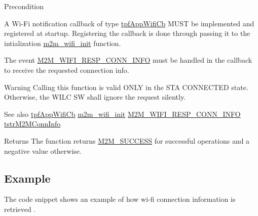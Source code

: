 \begin{DoxyPrecond}{Precondition}

\begin{DoxyItemize}
\item A Wi-\/\+Fi notification callback of type \hyperlink{group__WlanEnums_gac5302f32839285fe8375c159087aa8a1}{tpf\+App\+Wifi\+Cb} M\+U\+ST be implemented and registered at startup. Registering the callback is done through passing it to the intialization \hyperlink{group__WifiInitFn_ga73c734812e844d96d860c4e93e9daf35}{m2m\+\_\+wifi\+\_\+init} function.
\item The event \hyperlink{group__WlanEnums_gga064de09dec1d5e88ed8d075fa40f57dea35767ad0217ab92b149bc77e79610d33}{M2\+M\+\_\+\+W\+I\+F\+I\+\_\+\+R\+E\+S\+P\+\_\+\+C\+O\+N\+N\+\_\+\+I\+N\+FO} must be handled in the callback to receive the requested connection info.
\end{DoxyItemize}
\end{DoxyPrecond}
\begin{DoxyWarning}{Warning}
Calling this function is valid O\+N\+LY in the S\+TA C\+O\+N\+N\+E\+C\+T\+ED state. Otherwise, the W\+I\+LC SW shall ignore the request silently.
\end{DoxyWarning}
\begin{DoxySeeAlso}{See also}
\hyperlink{group__WlanEnums_gac5302f32839285fe8375c159087aa8a1}{tpf\+App\+Wifi\+Cb} \hyperlink{group__WifiInitFn_ga73c734812e844d96d860c4e93e9daf35}{m2m\+\_\+wifi\+\_\+init} \hyperlink{group__WlanEnums_gga064de09dec1d5e88ed8d075fa40f57dea35767ad0217ab92b149bc77e79610d33}{M2\+M\+\_\+\+W\+I\+F\+I\+\_\+\+R\+E\+S\+P\+\_\+\+C\+O\+N\+N\+\_\+\+I\+N\+FO} \hyperlink{structtstrM2MConnInfo}{tstr\+M2\+M\+Conn\+Info}
\end{DoxySeeAlso}
\begin{DoxyReturn}{Returns}
The function returns \hyperlink{nm__common_8h_a9ef27ba27aafdd1aa3a79d3ba2c36b8f}{M2\+M\+\_\+\+S\+U\+C\+C\+E\+SS} for successful operations and a negative value otherwise. 
\end{DoxyReturn}
\hypertarget{group__WifiEnableMonitorModeFn_Example}{}\subsection{Example}\label{group__WifiEnableMonitorModeFn_Example}
The code snippet shows an example of how wi-\/fi connection information is retrieved . 
